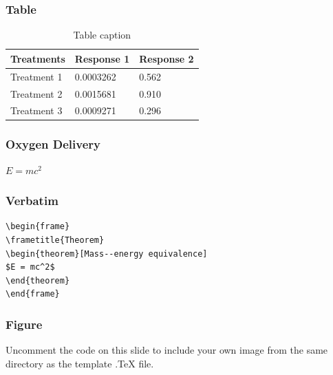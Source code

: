\documentclass{beamer}
\begin{document}
\begin{frame}
\frametitle{Table}
\begin{table}
\begin{tabular}{l l l}
\toprule
\textbf{Treatments} & \textbf{Response 1} & \textbf{Response 2}\\
\midrule
Treatment 1 & 0.0003262 & 0.562 \\
Treatment 2 & 0.0015681 & 0.910 \\
Treatment 3 & 0.0009271 & 0.296 \\
\bottomrule
\end{tabular}
\caption{Table caption}
\end{table}
\end{frame}


\begin{frame}
\frametitle{Oxygen Delivery}
\begin{theorem}
$E = mc^2$
\end{theorem}
\end{frame}


\begin{frame}[fragile] %
\frametitle{Verbatim}
\begin{example}
\begin{verbatim}
\begin{frame}
\frametitle{Theorem}
\begin{theorem}[Mass--energy equivalence]
$E = mc^2$
\end{theorem}
\end{frame}\end{verbatim}
\end{example}
\end{frame}


\begin{frame}
\frametitle{Figure}
Uncomment the code on this slide to include your own image from the same directory as the template .TeX file.
\end{frame}

\end{document}
